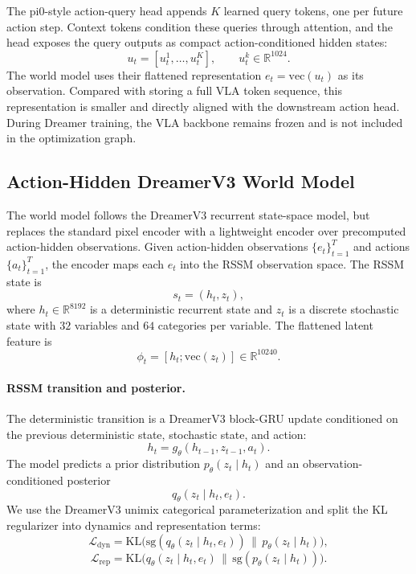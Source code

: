 The pi0-style action-query head appends $K$ learned query tokens, one per future action step. Context tokens condition these queries through attention, and the head exposes the query outputs as compact action-conditioned hidden states:
\[
u_t = [u_t^1,\ldots,u_t^K],
\qquad
u_t^k \in \mathbb{R}^{1024}.
\]
The world model uses their flattened representation $e_t=\mathrm{vec}(u_t)$ as its observation. Compared with storing a full VLA token sequence, this representation is smaller and directly aligned with the downstream action head. During Dreamer training, the VLA backbone remains frozen and is not included in the optimization graph.

\subsection{Action-Hidden DreamerV3 World Model}

The world model follows the DreamerV3 recurrent state-space model, but replaces the standard pixel encoder with a lightweight encoder over precomputed action-hidden observations. Given action-hidden observations $\{e_t\}_{t=1}^{T}$ and actions $\{a_t\}_{t=1}^{T}$, the encoder maps each $e_t$ into the RSSM observation space. The RSSM state is
\[
s_t = (h_t, z_t),
\]
where $h_t \in \mathbb{R}^{8192}$ is a deterministic recurrent state and $z_t$ is a discrete stochastic state with $32$ variables and $64$ categories per variable. The flattened latent feature is
\[
\phi_t = [h_t; \mathrm{vec}(z_t)] \in \mathbb{R}^{10240}.
\]

\paragraph{RSSM transition and posterior.}
The deterministic transition is a DreamerV3 block-GRU update conditioned on the previous deterministic state, stochastic state, and action:
\[
h_t = g_\theta(h_{t-1}, z_{t-1}, a_t).
\]
The model predicts a prior distribution $p_\theta(z_t \mid h_t)$ and an observation-conditioned posterior
\[
q_\theta(z_t \mid h_t, e_t).
\]
We use the DreamerV3 unimix categorical parameterization and split the KL regularizer into dynamics and representation terms:
\[
\mathcal{L}_{\text{dyn}} =
\mathrm{KL}\big(\mathrm{sg}(q_\theta(z_t \mid h_t,e_t)) \,\|\, p_\theta(z_t \mid h_t)\big),
\]
\[
\mathcal{L}_{\text{rep}} =
\mathrm{KL}\big(q_\theta(z_t \mid h_t,e_t) \,\|\, \mathrm{sg}(p_\theta(z_t \mid h_t))\big).
\]

